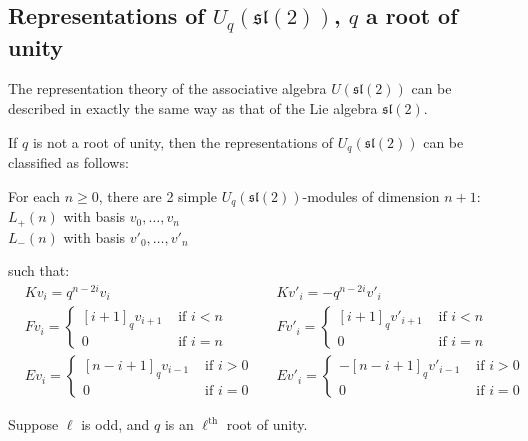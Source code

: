 \documentclass[]{article}
\begin{document}
\subsection{Representations of $U_q(\mathfrak{sl}(2))$, $q$ a root of unity}

The representation theory of the associative algebra $U(\mathfrak{sl}(2))$ can
be described in exactly the same way as that of the Lie algebra
$\mathfrak{sl(2)}$. 

If $q$ is not a root of unity, then the representations of $U_q(\mathfrak{sl}(2))$ can be classified as follows: 

For each $n\geq 0$, there are 2 simple $U_q(\mathfrak{sl}(2))$-modules of dimension $n+1$: 
$L_+(n)$ with basis $v_0, \ldots, v_n$ \\
$L_-(n)$ with basis $v'_0, \ldots, v'_n$

such that: 
\begin{align*}
    &K v_i = q^{n-2i} v_i  &
    &K v'_i = -q^{n-2i} v'_i \\
    &F v_i = \begin{cases} [i+1]_qv_{i+1}& \text{ if $i < n$} \\ 0& \text{ if $i = n$} \end{cases} &
    &F v'_i = \begin{cases} [i+1]_qv'_{i+1}& \text{ if $i < n$} \\ 0& \text{ if $i = n$} \end{cases} \\
    &E v_i = \begin{cases} 
                     [n-i+1]_qv_{i-1}& \text{ if $i > 0$} \\ 
                    0& \text{ if $i = 0$} 
             \end{cases} &
    &E v'_i = \begin{cases} 
                    -[n-i+1]_q v'_{i-1}& \text{ if $i > 0$} \\ 
                    0& \text{ if $i = 0$} 
             \end{cases}
\end{align*}


Suppose $\ell$ is odd, and $q$ is an $\ell^{\text{th}}$ root of unity. 
\end{document}
